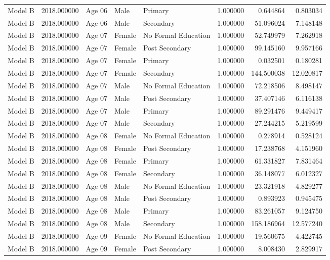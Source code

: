 \begin{table}[ht]
\begin{tabular}{lrlllrrr}
Model B & 2018.000000 & Age 06 & Male & Primary & 1.000000 & 0.644864 & 0.803034 \\
Model B & 2018.000000 & Age 06 & Male & Secondary & 1.000000 & 51.096024 & 7.148148 \\
Model B & 2018.000000 & Age 07 & Female & No Formal Education & 1.000000 & 52.749979 & 7.262918 \\
Model B & 2018.000000 & Age 07 & Female & Post Secondary & 1.000000 & 99.145160 & 9.957166 \\
Model B & 2018.000000 & Age 07 & Female & Primary & 1.000000 & 0.032501 & 0.180281 \\
Model B & 2018.000000 & Age 07 & Female & Secondary & 1.000000 & 144.500038 & 12.020817 \\
Model B & 2018.000000 & Age 07 & Male & No Formal Education & 1.000000 & 72.218506 & 8.498147 \\
Model B & 2018.000000 & Age 07 & Male & Post Secondary & 1.000000 & 37.407146 & 6.116138 \\
Model B & 2018.000000 & Age 07 & Male & Primary & 1.000000 & 89.291476 & 9.449417 \\
Model B & 2018.000000 & Age 07 & Male & Secondary & 1.000000 & 27.244215 & 5.219599 \\
Model B & 2018.000000 & Age 08 & Female & No Formal Education & 1.000000 & 0.278914 & 0.528124 \\
Model B & 2018.000000 & Age 08 & Female & Post Secondary & 1.000000 & 17.238768 & 4.151960 \\
Model B & 2018.000000 & Age 08 & Female & Primary & 1.000000 & 61.331827 & 7.831464 \\
Model B & 2018.000000 & Age 08 & Female & Secondary & 1.000000 & 36.148077 & 6.012327 \\
Model B & 2018.000000 & Age 08 & Male & No Formal Education & 1.000000 & 23.321918 & 4.829277 \\
Model B & 2018.000000 & Age 08 & Male & Post Secondary & 1.000000 & 0.893923 & 0.945475 \\
Model B & 2018.000000 & Age 08 & Male & Primary & 1.000000 & 83.261057 & 9.124750 \\
Model B & 2018.000000 & Age 08 & Male & Secondary & 1.000000 & 158.186964 & 12.577240 \\
Model B & 2018.000000 & Age 09 & Female & No Formal Education & 1.000000 & 19.560675 & 4.422745 \\
Model B & 2018.000000 & Age 09 & Female & Post Secondary & 1.000000 & 8.008430 & 2.829917 \\

\end{tabular}
\end{table}
